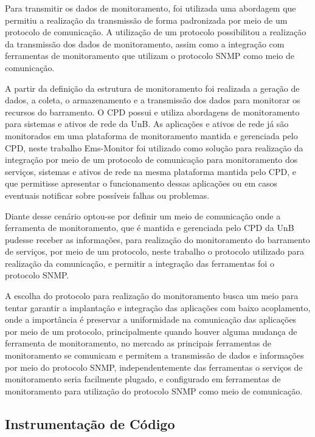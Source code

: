 Para transmitir os dados de monitoramento, foi utilizada uma abordagem que permitiu a realização da transmissão de forma padronizada por meio de um protocolo de comunicação. A utilização de um protocolo possibilitou a realização da transmissão dos dados de monitoramento, assim como a integração com ferramentas de monitoramento que utilizam o protocolo \acrshort{SNMP} como meio de comunicação.  

\vspace{10mm}
\noindent
A partir da definição da estrutura de monitoramento foi realizada a geração de dados, a coleta, o armazenamento e a transmissão dos dados para monitorar os recursos do barramento. O \acrshort{CPD} possui e utiliza abordagens de monitoramento para sistemas e ativos de rede da \acrshort{UnB}. As aplicações e ativos de rede já são monitorados em uma plataforma de monitoramento mantida e gerenciada pelo \acrshort{CPD}, neste trabalho Ems-Monitor foi utilizado como solução para realização da integração por meio de um protocolo de comunicação para monitoramento dos serviços, sistemas e ativos de rede na mesma plataforma mantida pelo \acrshort{CPD}, e que permitisse apresentar o funcionamento dessas aplicações ou em casos eventuais notificar sobre possíveis falhas ou problemas. 

Diante desse cenário optou-se por definir um meio de comunicação onde a ferramenta de monitoramento, que é mantida e gerenciada pelo \acrshort{CPD} da \acrshort{UnB} pudesse receber as informações, para realização do monitoramento do barramento de serviços, por meio de um protocolo, neste trabalho o protocolo utilizado para realização da comunicação, e permitir a integração das ferramentas foi o protocolo \acrshort{SNMP}. 

A escolha do protocolo para realização do monitoramento busca um meio para tentar garantir a implantação e integração das aplicações com baixo acoplamento, onde a importância é preservar a uniformidade na comunicação das aplicações por meio de um protocolo, principalmente quando houver alguma mudança de ferramenta de monitoramento, no mercado as principais ferramentas de monitoramento se comunicam e permitem a transmissão de dados e informações por meio do protocolo \acrshort{SNMP}, independentemente das ferramentas o serviços de monitoramento seria facilmente plugado, e configurado em ferramentas de monitoramento para utilização do protocolo \acrshort{SNMP} como meio de comunicação.      

\subsection{Instrumentação de Código}
\label{instrumentacaoErlangms}

